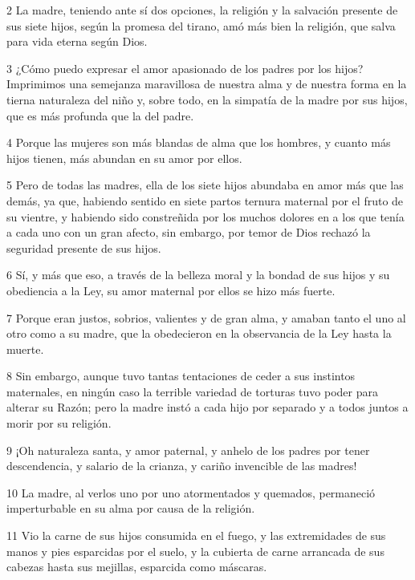 \par 2 La madre, teniendo ante sí dos opciones, la religión y la salvación presente de sus siete hijos, según la promesa del tirano, amó más bien la religión, que salva para vida eterna según Dios.

\par 3 ¿Cómo puedo expresar el amor apasionado de los padres por los hijos? Imprimimos una semejanza maravillosa de nuestra alma y de nuestra forma en la tierna naturaleza del niño y, sobre todo, en la simpatía de la madre por sus hijos, que es más profunda que la del padre.

\par 4 Porque las mujeres son más blandas de alma que los hombres, y cuanto más hijos tienen, más abundan en su amor por ellos.

\par 5 Pero de todas las madres, ella de los siete hijos abundaba en amor más que las demás, ya que, habiendo sentido en siete partos ternura maternal por el fruto de su vientre, y habiendo sido constreñida por los muchos dolores en a los que tenía a cada uno con un gran afecto, sin embargo, por temor de Dios rechazó la seguridad presente de sus hijos.

\par 6 Sí, y más que eso, a través de la belleza moral y la bondad de sus hijos y su obediencia a la Ley, su amor maternal por ellos se hizo más fuerte.

\par 7 Porque eran justos, sobrios, valientes y de gran alma, y ​​amaban tanto el uno al otro como a su madre, que la obedecieron en la observancia de la Ley hasta la muerte.

\par 8 Sin embargo, aunque tuvo tantas tentaciones de ceder a sus instintos maternales, en ningún caso la terrible variedad de torturas tuvo poder para alterar su Razón; pero la madre instó a cada hijo por separado y a todos juntos a morir por su religión.

\par 9 ¡Oh naturaleza santa, y amor paternal, y anhelo de los padres por tener descendencia, y salario de la crianza, y cariño invencible de las madres!

\par 10 La madre, al verlos uno por uno atormentados y quemados, permaneció imperturbable en su alma por causa de la religión.

\par 11 Vio la carne de sus hijos consumida en el fuego, y las extremidades de sus manos y pies esparcidas por el suelo, y la cubierta de carne arrancada de sus cabezas hasta sus mejillas, esparcida como máscaras.

